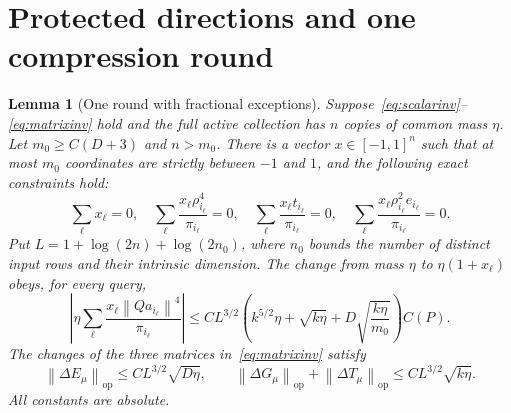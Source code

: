 \documentclass[11pt]{article}
\newtheorem{lemma}[theorem]{Lemma}
\theoremstyle{remark}\newtheorem{remark}[theorem]{Remark}
\newcommand{\op}{\mathrm{op}}\newcommand{\Frob}{\mathrm F}
\newcommand{\norm}[1]{\left\lVert#1\right\rVert}\newcommand{\abs}[1]{\left|#1\right|}
\numberwithin{equation}{section}
\begin{document}
\section{Protected directions and one compression round}\label{sec:round}
\begin{lemma}[One round with fractional exceptions]\label{lem:round}
Suppose~\eqref{eq:scalarinv}--\eqref{eq:matrixinv} hold and the full active collection has $n$ copies of common mass $\eta$. Let $m_0\ge C(D+3)$ and $n>m_0$. There is a vector $x\in[-1,1]^n$ such that at most $m_0$ coordinates are strictly between $-1$ and $1$, and the following exact constraints hold:
\begin{equation}\label{eq:exactconstraints}
 \sum_\ell x_\ell=0,\quad
 \sum_\ell\frac{x_\ell\rho_{i_\ell}^4}{\pi_{i_\ell}}=0,\quad
 \sum_\ell\frac{x_\ell t_{i_\ell}}{\pi_{i_\ell}}=0,\quad
 \sum_\ell\frac{x_\ell\rho_{i_\ell}^2e_{i_\ell}}{\pi_{i_\ell}}=0.
\end{equation}
Put $L=1+\log(2n)+\log(2n_0)$, where $n_0$ bounds the number of distinct input rows and their intrinsic dimension. The change from mass $\eta$ to $\eta(1+x_\ell)$ obeys, for every query,
\begin{equation}\label{eq:roundcost}
 \abs{\eta\sum_\ell\frac{x_\ell\norm{Qa_{i_\ell}}^4}{\pi_{i_\ell}}}
 \le C L^{3/2}
 \left(k^{5/2}\eta+\sqrt{k\eta}+D\sqrt{\frac{k\eta}{m_0}}\right)C(P).
\end{equation}
The changes of the three matrices in~\eqref{eq:matrixinv} satisfy
\begin{equation}\label{eq:roundstats}
 \norm{\Delta E_\mu}_\op\le CL^{3/2}\sqrt{D\eta},\qquad
 \norm{\Delta G_\mu}_\op+\norm{\Delta T_\mu}_\op\le CL^{3/2}\sqrt{k\eta}.
\end{equation}
All constants are absolute.
\end{lemma}
\end{document}
